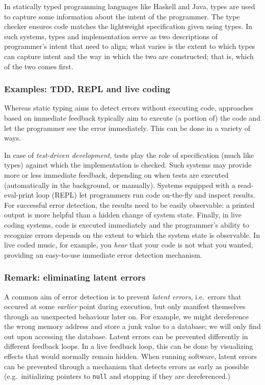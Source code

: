 \documentclass[english,submission]{programming}
\begin{document}
In statically typed programming languages like Haskell and Java, types
are used to capture some information about the intent of the programmer.
The type checker ensures code matches the lightweight specification
given using types. In such systems, types and implementation serve as
two descriptions of programmer's intent that need to align; what varies
is the extent to which types can capture intent and the way in which the
two are constructed; that is, which of the two comes first.

\hypertarget{examples-tdd-repl-and-live-coding}{%
\subsubsection{Examples: TDD, REPL and live
coding}\label{examples-tdd-repl-and-live-coding}}

Whereas static typing aims to detect errors without executing code,
approaches based on immediate feedback typically aim to execute (a
portion of) the code and let the programmer see the error immediately.
This can be done in a variety of ways.

In case of \emph{test-driven development}, tests play the role of
specification (much like types) against which the implementation is
checked. Such systems may provide more or less immediate feedback,
depending on when tests are executed (automatically in the background,
or manually). Systems equipped with a read-eval-print loop (REPL) let
programmers run code on-the-fly and inspect results. For successful
error detection, the results need to be easily observable: a printed
output is more helpful than a hidden change of system state. Finally, in
live coding systems, code is executed immediately and the programmer's
ability to recognize errors depends on the extent to which the system
state is observable. In live coded music, for example, you \emph{hear}
that your code is not what you wanted, providing an easy-to-use
immediate error detection mechanism.

\hypertarget{remark-eliminating-latent-errors}{%
\subsubsection{Remark: eliminating latent
errors}\label{remark-eliminating-latent-errors}}

A common aim of error detection is to prevent \emph{latent errors},
i.e.~errors that occured at some \emph{earlier} point during execution,
but only manifest themselves through an unexpected behaviour later on.
For example, we might dereference the wrong memory address and store a
junk value to a database; we will only find out upon accessing the
database. Latent errors can be prevented differently in different
feedback loops. In a live feedback loop, this can be done by visualizing
effects that would normally remain hidden. When running software, latent
errors can be prevented through a mechanism that detects errors as early
as possible (e.g.~initializing pointers to \texttt{null} and stopping if
they are dereferenced.)
\end{document}

